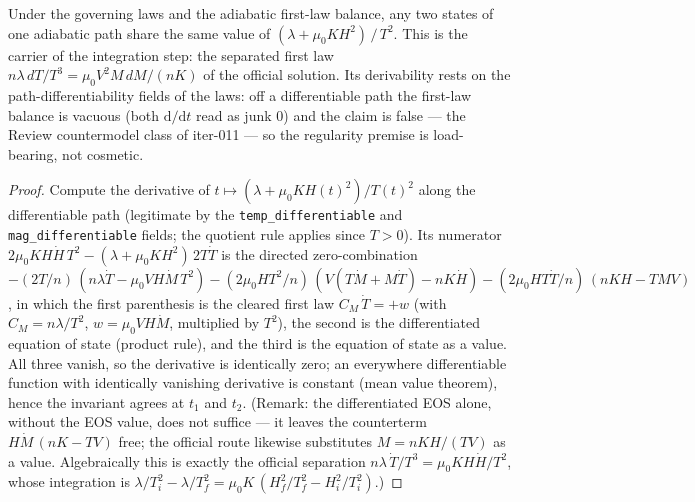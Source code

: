 \begin{lemma}
\label{lem:IPhO2026Problems_problem_IPhO_2026_3_B_2:adiabatic_invariant_along_path}
Under the governing laws and the adiabatic first-law balance, any two states
of one adiabatic path share the same value of
$(\lambda + \mu_0 K H^2)\,/\,T^2$.
This is the carrier of the integration step: the separated first law
$n\lambda\,dT/T^3 = \mu_0 V^2 M\,dM/(nK)$ of the official solution.
Its derivability rests on the path-differentiability fields of the laws:
off a differentiable path the first-law balance is vacuous (both
$\mathrm{d}/\mathrm{d}t$ read as junk $0$) and the claim is false --- the
Review countermodel class of iter-011 --- so the regularity premise is
load-bearing, not cosmetic.
\end{lemma}
\begin{proof}
Compute the derivative of $t \mapsto (\lambda + \mu_0 K H(t)^2)/T(t)^2$
along the differentiable path (legitimate by the
\texttt{temp\_differentiable} and \texttt{mag\_differentiable} fields;
the quotient rule applies since $T > 0$).  Its numerator
$2\mu_0 K H \dot H\,T^2 - (\lambda + \mu_0 K H^2)\,2T\dot T$ is the
directed zero-combination
$-(2T/n)\,(n\lambda\dot T - \mu_0 V H \dot M\,T^2)
 -(2\mu_0 H T^2/n)\,(V(T\dot M + M\dot T) - nK\dot H)
 -(2\mu_0 H T \dot T/n)\,(nKH - TMV)$,
in which the first parenthesis is the cleared first law $C_M\,\dot T = +w$
(with $C_M = n\lambda/T^2$, $w = \mu_0 V H \dot M$, multiplied by $T^2$),
the second is the differentiated equation of state (product rule), and the
third is the equation of state as a value.  All three vanish, so the
derivative is identically zero; an everywhere differentiable function with
identically vanishing derivative is constant (mean value theorem), hence
the invariant agrees at $t_1$ and $t_2$.  (Remark: the differentiated EOS
alone, without the EOS value, does not suffice --- it leaves the
counterterm $H\dot M\,(nK - TV)$ free; the official route likewise
substitutes $M = nKH/(TV)$ as a value.  Algebraically this is exactly the
official separation $n\lambda\,\dot T/T^3 = \mu_0 K H \dot H/T^2$, whose
integration is
$\lambda/T_i^2 - \lambda/T_f^2 = \mu_0 K\,(H_f^2/T_f^2 - H_i^2/T_i^2)$.)
\end{proof}

